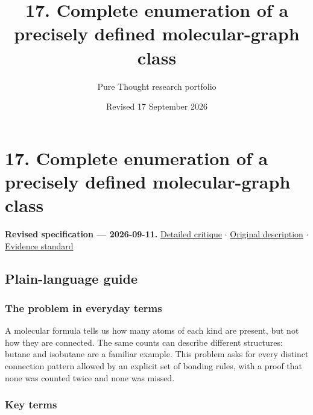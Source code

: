 \documentclass[
  11pt,
]{article}
\title{17. Complete enumeration of a precisely defined molecular-graph
class}
\author{Pure Thought research portfolio}
\date{Revised 17 September 2026}
\newcounter{none} %
\begin{document}
\maketitle
\thispagestyle{empty}
\clearpage

\section{17. Complete enumeration of a precisely defined molecular-graph
class}

\textbf{Revised specification --- 2026-09-11.}
\href{https://github.com/rick-stevens-ai/Pure-Thought/blob/main/reviews/17-Isomer-Enumeration-Molecular-Graphs.md}{Detailed
critique} \ensuremath{\cdot}
\href{https://github.com/rick-stevens-ai/Pure-Thought/blob/main/archive/original-PRDs/17-Isomer-Enumeration-Molecular-Graphs.md}{Original
description} \ensuremath{\cdot}
\href{https://github.com/rick-stevens-ai/Pure-Thought/blob/main/reviews/EVIDENCE-STANDARD.md}{Evidence
standard}

\subsection{Plain-language guide}

\subsubsection{The problem in everyday terms}

A molecular formula tells us how many atoms of each kind are present,
but not how they are connected. The same counts can describe different
structures: butane and isobutane are a familiar example. This problem
asks for every distinct connection pattern allowed by an explicit set of
bonding rules, with a proof that none was counted twice and none was
missed.

\subsubsection{Key terms}
\end{document}
